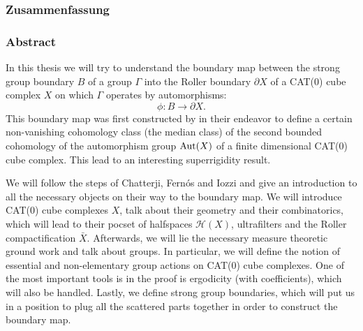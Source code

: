 
\subsubsection*{Zusammenfassung}
%
\label{sec:Zusammenfassung}


\subsubsection*{Abstract}
\label{sec:abstract}

In this thesis we will try to understand the boundary map between the strong group boundary \(B\) of a group \(\Gamma\) into the Roller boundary \(\partial X\) of a CAT(0) cube complex \(X\) on which \(\Gamma\) operates by automorphisms:
\[
  \phi\colon B \to \partial X.
\]
This boundary map was first constructed by \textcite{MR3509968} in their endeavor to define a certain non-vanishing cohomology class (the median class) of the second bounded cohomology of the automorphism group \(\operatorname{Aut}(X)\) of a finite dimensional CAT(0) cube complex. This lead to an interesting superrigidity result.

We will follow the steps of Chatterji, Fernós and Iozzi and give an introduction to all the necessary objects on their way to the boundary map. We will introduce CAT(0) cube complexes \(X\), talk about their geometry and their combinatorics, which will lead to their pocset of halfspaces \(\mathcal{H}(X)\), ultrafilters and the Roller compactification \(\bar X\). Afterwards, we will lie the necessary measure theoretic ground work and talk about groups. In particular, we will define the notion of essential and non-elementary group actions on CAT(0) cube complexes. One of the most important tools is in the proof is ergodicity (with coefficients), which will also be handled. Lastly, we define strong group boundaries, which will put us in a position to plug all the scattered parts together in order to construct the boundary map.

